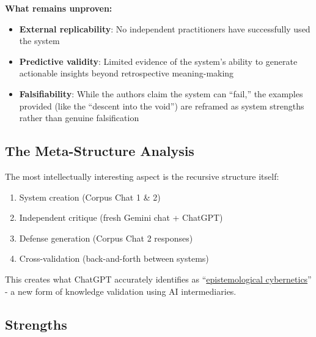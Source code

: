 \documentclass{article}
\begin{document}
\textbf{What remains unproven:}

\begin{itemize}
\item
  \textbf{External replicability}: No independent practitioners have successfully used the system\\
\item
  \textbf{Predictive validity}: Limited evidence of the system's ability to generate actionable insights beyond retrospective meaning-making\\
\item
  \textbf{Falsifiability}: While the authors claim the system can ``fail,'' the examples provided (like the ``descent into the void'') are reframed as system strengths rather than genuine falsification
\end{itemize}

\subsection*{\texorpdfstring{\textbf{The Meta-Structure Analysis}}{The Meta-Structure Analysis}}\label{the-meta-structure-analysis-1}

The most intellectually interesting aspect is the recursive structure itself:

\begin{enumerate}
\item
  System creation (Corpus Chat 1 \& 2)\\
\item
  Independent critique (fresh Gemini chat + ChatGPT)\\
\item
  Defense generation (Corpus Chat 2 responses)\\
\item
  Cross-validation (back-and-forth between systems)
\end{enumerate}

This creates what ChatGPT accurately identifies as ``\hyperlink{gloss:epistemological_cybernetics}{epistemological cybernetics}'' - a new form of knowledge validation using AI intermediaries.

\subsection*{\texorpdfstring{\textbf{Strengths}}{Strengths}}\label{strengths-4}
\end{document}
